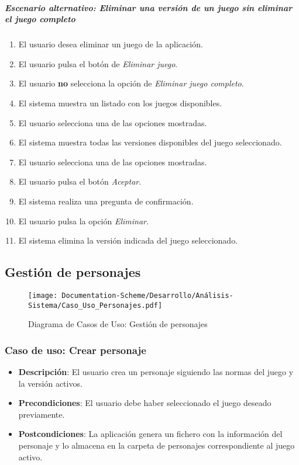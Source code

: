 \subparagraph{Escenario alternativo: Eliminar una versión de un juego sin eliminar el juego completo}
\begin{enumerate}
    \item El usuario desea eliminar un juego de la aplicación.
    \item El usuario pulsa el botón de \textit{Eliminar juego}.
    \item El usuario \textbf{no} selecciona la opción de \textit{Eliminar juego completo}.
    \item El sistema muestra un listado con los juegos disponibles.
    \item El usuario selecciona una de las opciones mostradas.
    \item El sistema muestra todas las versiones disponibles del juego seleccionado.
    \item El usuario selecciona una de las opciones mostradas.
    \item El usuario pulsa el botón \textit{Aceptar}.
    \item El sistema realiza una pregunta de confirmación.
    \item El usuario pulsa la opción \textit{Eliminar}.
    \item El sistema elimina la versión indicada del juego seleccionado.
\end{enumerate}

\newpage
\subsection{Gestión de personajes}
\begin{figure}[H]
    \centering
    \texttt{[image: Documentation-Scheme/Desarrollo/Análisis-Sistema/Caso\_Uso\_Personajes.pdf]}
    \caption{Diagrama de Casos de Uso: Gestión de personajes}
    \label{Diagrama_gestión_personajes}    
\end{figure}

\subsubsection{Caso de uso: Crear personaje}
\begin{itemize}
    \item \textbf{Descripción}: El usuario crea un personaje siguiendo las normas del juego y la versión activos.
    \item \textbf{Precondiciones}: El usuario debe haber seleccionado el juego deseado previamente.
    \item \textbf{Postcondiciones}: La aplicación genera un fichero con la información del personaje 
    y lo almacena en la carpeta de personajes correspondiente al juego activo.
\end{itemize}

